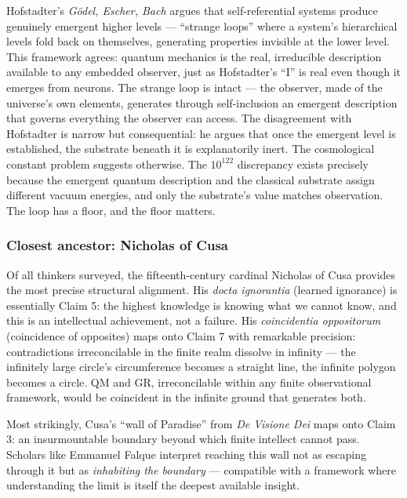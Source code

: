 \documentclass[
]{article}
\begin{document}
Hofstadter's \emph{Gödel, Escher, Bach} argues that self-referential
systems produce genuinely emergent higher levels --- ``strange loops''
where a system's hierarchical levels fold back on themselves, generating
properties invisible at the lower level. This framework agrees: quantum
mechanics is the real, irreducible description available to any embedded
observer, just as Hofstadter's ``I'' is real even though it emerges from
neurons. The strange loop is intact --- the observer, made of the
universe's own elements, generates through self-inclusion an emergent
description that governs everything the observer can access. The
disagreement with Hofstadter is narrow but consequential: he argues that
once the emergent level is established, the substrate beneath it is
explanatorily inert. The cosmological constant problem suggests
otherwise. The \(10^{122}\) discrepancy exists precisely because the
emergent quantum description and the classical substrate assign
different vacuum energies, and only the substrate's value matches
observation. The loop has a floor, and the floor matters.

\hypertarget{closest-ancestor-nicholas-of-cusa}{%
\subsubsection{Closest ancestor: Nicholas of
Cusa}\label{closest-ancestor-nicholas-of-cusa}}

Of all thinkers surveyed, the fifteenth-century cardinal Nicholas of
Cusa provides the most precise structural alignment. His \emph{docta
ignorantia} (learned ignorance) is essentially Claim 5: the highest
knowledge is knowing what we cannot know, and this is an intellectual
achievement, not a failure. His \emph{coincidentia oppositorum}
(coincidence of opposites) maps onto Claim 7 with remarkable precision:
contradictions irreconcilable in the finite realm dissolve in infinity
--- the infinitely large circle's circumference becomes a straight line,
the infinite polygon becomes a circle. QM and GR, irreconcilable within
any finite observational framework, would be coincident in the infinite
ground that generates both.

Most strikingly, Cusa's ``wall of Paradise'' from \emph{De Visione Dei}
maps onto Claim 3: an insurmountable boundary beyond which finite
intellect cannot pass. Scholars like Emmanuel Falque interpret reaching
this wall not as escaping through it but as \emph{inhabiting the
boundary} --- compatible with a framework where understanding the limit
is itself the deepest available insight.
\end{document}
